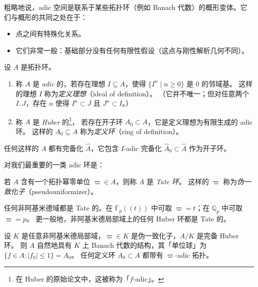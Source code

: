 粗略地说，adic 空间是联系于某些拓扑环（例如 Banach 代数）的概形变体。它们与概形的共同之处在于：
\begin{itemize}
  \item 点之间有特殊化关系。
  \item 它们非常一般：基础部分没有任何有限性假设（这点与刚性解析几何不同）。
\end{itemize}

\begin{definition}
设 $A$ 是拓扑环。
\begin{enumerate}[label=(\arabic*), leftmargin=2.6em]
  \item 称 $A$ 是 \emph{adic} 的，若存在理想 $I\subseteq A$，使得 $\{I^n\mid n\ge0\}$ 是 $0$ 的邻域基。
        这样的理想 $I$ 称为\emph{定义理想}（ideal of definition）。
        （它并不唯一；但对任意两个 $I,J$，存在 $n$ 使得 $I^n\subset J$ 且 $J^n\subset I$。）
  \item 称 $A$ 是 \emph{Huber} 的\footnote{在 Huber 的原始论文中，这被称为「$f$-adic」。}，
        若存在开子环 $A_0\subset A$，它是定义理想为有限生成的 adic 环。
        这样的 $A_0\subseteq A$ 称为\emph{定义环}（ring of definition）。
\end{enumerate}
\end{definition}

\begin{remark}
任何这样的 $A$ 都有完备化 $\widehat{A}$，它包含 $I$-adic 完备化 $\widehat{A}_0\subset\widehat{A}$ 作为开子环。
\end{remark}

对我们最重要的一类 adic 环是：

\begin{definition}
若 $A$ 含有一个拓扑幂零单位 $\varpi\in A$，则称 $A$ 是 \emph{Tate 环}。
这样的 $\varpi$ 称为\emph{伪一致化子}（pseudouniformizer）。
\end{definition}

\begin{example}
任何非阿基米德域都是 Tate 的。在 $\mathbb{F}_p((t))$ 中可取 $\varpi=t$；在 $\mathbb{Q}_p$ 中可取 $\varpi=p$。
更一般地，非阿基米德局部域上的任何 Huber 环都是 Tate 的。
\end{example}

\begin{remark}
设 $K$ 是任意非阿基米德局部域，$\varpi\in K$ 是伪一致化子，$A/K$ 是完备 Huber 环。
则 $A$ 自然地具有 $K$ 上 Banach 代数的结构，其「单位球」为
$\{f\in A:|f_0|\le1\}=A_0$。
任何定义环 $A_0\subset A$ 都带有 $\varpi$-adic 拓扑。
\end{remark}

